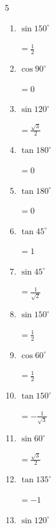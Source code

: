 \begin{multicols}{5}
\begin{enumerate}
        $\displaystyle =-\sqrt{3}$

  \item $\displaystyle \sin{150^\circ}$

        $\displaystyle =\frac{1}{2}$

  \item $\displaystyle \cos{90^\circ}$

        $\displaystyle =0$

  \item $\displaystyle \sin{120^\circ}$

        $\displaystyle =\frac{\sqrt{3}}{2}$

  \item $\displaystyle \tan{180^\circ}$

        $\displaystyle =0$

  \item $\displaystyle \tan{180^\circ}$

        $\displaystyle =0$

  \item $\displaystyle \tan{45^\circ}$

        $\displaystyle =1$

  \item $\displaystyle \sin{45^\circ}$

        $\displaystyle =\frac{1}{\sqrt{2}}$

  \item $\displaystyle \sin{150^\circ}$

        $\displaystyle =\frac{1}{2}$

\columnbreak %

  \item $\displaystyle \cos{60^\circ}$

        $\displaystyle =\frac{1}{2}$

  \item $\displaystyle \tan{150^\circ}$

        $\displaystyle =-\frac{1}{\sqrt{3}}$

  \item $\displaystyle \sin{60^\circ}$

        $\displaystyle =\frac{\sqrt{3}}{2}$

  \item $\displaystyle \tan{135^\circ}$

        $\displaystyle =-1$

  \item $\displaystyle \sin{120^\circ}$


\end{enumerate}
\end{multicols}
